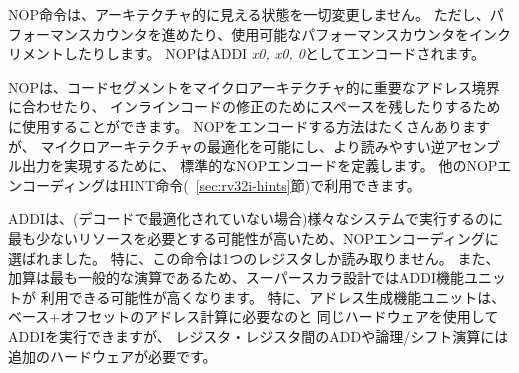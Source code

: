 NOP命令は、アーキテクチャ的に見える状態を一切変更しません。
ただし、パフォーマンスカウンタを進めたり、使用可能なパフォーマンスカウンタをインクリメントしたりします。
NOPはADDI {\em x0, x0, 0}としてエンコードされます。

\begin{commentary}
\begin{comment}
NOPs can be used to align code segments to microarchitecturally
significant address boundaries, or to leave space for inline code
modifications.  Although there are many possible ways to encode a NOP,
we define a canonical NOP encoding to allow microarchitectural
optimizations as well as for more readable disassembly output.  The
other NOP encodings are made available for HINT instructions
(Section~\ref{sec:rv32i-hints}).
\end{comment}

NOPは、コードセグメントをマイクロアーキテクチャ的に重要なアドレス境界に合わせたり、
インラインコードの修正のためにスペースを残したりするために使用することができます。 
NOPをエンコードする方法はたくさんありますが、
マイクロアーキテクチャの最適化を可能にし、より読みやすい逆アセンブル出力を実現するために、
標準的なNOPエンコードを定義します。
他のNOPエンコーディングはHINT命令(~\ref{sec:rv32i-hints}節)で利用できます。

\begin{comment}
ADDI was chosen for the NOP encoding as this is most likely to take
fewest resources to execute across a range of systems (if not
optimized away in decode).  In particular, the instruction only reads
one register.  Also, an ADDI functional unit is more likely to be
available in a superscalar design as adds are the most common
operation.  In particular, address-generation functional units can
execute ADDI using the same hardware needed for base+offset address
calculations, while register-register ADD or logical/shift operations
require additional hardware.
\end{comment}

ADDIは、(デコードで最適化されていない場合)様々なシステムで実行するのに
最も少ないリソースを必要とする可能性が高いため、NOPエンコーディングに選ばれました。
特に、この命令は1つのレジスタしか読み取りません。
また、加算は最も一般的な演算であるため、スーパースカラ設計ではADDI機能ユニットが
利用できる可能性が高くなります。
特に、アドレス生成機能ユニットは、ベース+オフセットのアドレス計算に必要なのと
同じハードウェアを使用してADDIを実行できますが、
レジスタ・レジスタ間のADDや論理/シフト演算には追加のハードウェアが必要です。
\end{commentary}

